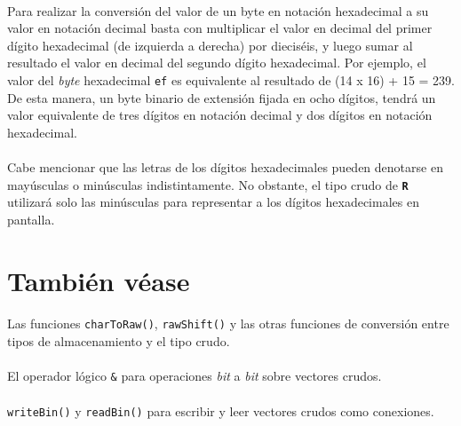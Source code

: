 \documentclass{article}[letter, 12pt]
\def\code#1{\texttt{#1}}
\def\codename#1{\textbf{\texttt{\color{gray}#1}}}
\begin{document}
\paragraph{}Para realizar la conversión del valor de un byte en notación hexadecimal a su valor en notación decimal basta con multiplicar el valor en decimal del primer dígito hexadecimal (de izquierda a derecha) por dieciséis, y luego sumar al resultado el valor en decimal del segundo dígito hexadecimal. Por ejemplo, el valor del \textit{byte} hexadecimal \code{ef} es equivalente al resultado de (14 x 16) + 15 = 239. De esta manera, un byte binario de extensión fijada en ocho dígitos, tendrá un valor equivalente de tres dígitos en notación decimal y dos dígitos en notación hexadecimal.\par

\paragraph{}Cabe mencionar que las letras de los dígitos hexadecimales pueden denotarse en mayúsculas o minúsculas indistintamente. No obstante, el tipo crudo de \codename{R} utilizará solo las minúsculas para representar a los dígitos hexadecimales en pantalla.\par

\section{\color{gray}También véase}
\paragraph{}Las funciones \code{charToRaw()}, \code{rawShift()} y las otras funciones de conversión entre tipos de almacenamiento y el tipo crudo.\par
\paragraph{}El operador lógico \code{\&} para operaciones \textit{bit} a \textit{bit} sobre vectores crudos.\par
\paragraph{}\code{writeBin()} y \code{readBin()} para escribir y leer vectores crudos como conexiones.\par
\end{document}

